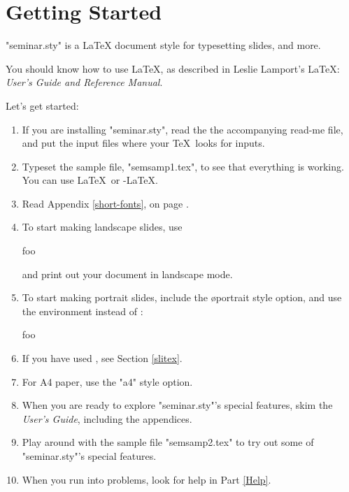 \twosideclearpage

\section*{Getting Started}

"seminar.sty" is a \LaTeX{} document style for typesetting slides, and more.

You should know how to use \LaTeX, as described in Leslie Lamport's \LaTeX:
{\em User's Guide and Reference Manual}.

Let's get started:
\begin{enumerate}
\item If you are installing "seminar.sty", read the the accompanying read-me
file, and put the input files where your \TeX\ looks for inputs.

\item Typeset the sample file, "semsamp1.tex", to see that everything is
working. You can use \LaTeX\ or \AmS-\LaTeX.

\item Read Appendix \ref{short-fonts}, on page \pageref{short-fonts}.

\item To start making landscape slides, use
\begin{LVerbatim}
  
  \begin{slide}
    foo
  \end{slide}
  
\end{LVerbatim}
and print out your document in landscape mode.

\item To start making portrait slides, include the \o{portrait} style option,
and use the  environment instead of :
\begin{LVerbatim}
  
  \begin{slide*}
    foo
  \end{slide*}
  
\end{LVerbatim}

\item If you have used \SliTeX, see Section \ref{slitex}.

\item For A4 paper, use the "a4" style option.

\item When you are ready to explore "seminar.sty"'s special features, skim the
{\em User's Guide}, including the appendices.

\item Play around with the sample file "semsamp2.tex" to try out some of
"seminar.sty"'s special features.

\item When you run into problems, look for help in Part \ref{Help}.

\end{enumerate}

